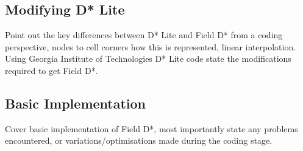 \subsection{Modifying D* Lite}
Point out the key differences between D* Lite and Field D* from a coding perspective, nodes to cell corners how this is represented, linear interpolation. Using Georgia Institute of Technologies D* Lite code state the modifications required to get Field D*.

\subsection{Basic Implementation}
Cover basic implementation of Field D*, most importantly state any problems encountered, or variations/optimisations made during the coding stage.

